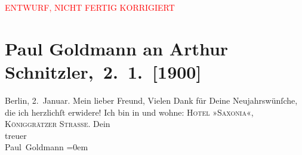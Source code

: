 
\begin{center}
            \textcolor{red}{ENTWURF, NICHT FERTIG KORRIGIERT}
                      \end{center}
            
         \renewcommand{\erwaehnteInstitutionen}{Institutionen: Neue Freie Presse}
         \renewcommand{\erwaehnteOrte}{Orte: Berlin, Hotel Saxonia, Stresemannstraße, Wien}
         \renewcommand{\erwaehnteWerke}{}
               \section[ Paul Goldmann an Arthur Schnitzler, 2. 1. {[}1900{]}]{ Paul Goldmann an Arthur Schnitzler, 2. 1. {[}1900{]}}\nopagebreak{}\rehead{ }\begin{ledgroupsized}[t]{13cm}\normalsize\beginnumbering \toendnotes[C]{\smallbreak\pagebreak[2]} 
\toendnotes[C]{\smallbreak}\pstart
           \centering{}{\pb}Berlin, 2. Januar.\pend
           \pstart{}Mein lieber Freund,\pend\pstart
           Vielen Dank für Deine Neujahrswünſche, die ich herzlichſt erwidere!\pend
           \pstart
           Ich bin in \label{K_L02901-1v}\label{K_L02901-1h} und wohne: \textsc{Hotel »Saxonia«, Königgrätzer Straße}.\pend
           \pstart
           Dein {\\[\baselineskip]}treuer {\\[\baselineskip]}\spacefill\mbox{Paul Goldmann}\pend
           \leftskip=0em{}
         
         \endnumbering{}\end{ledgroupsized}\begin{anhang}\end{anhang}\newcommand{\dateiname}{L02901}\newcommand{\titel}{Paul Goldmann an Arthur Schnitzler, 2. 1. [1900]}\newcommand{\editorInnen}{Martin Anton Müller und Laura Untner}
      